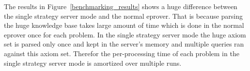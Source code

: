 The results in Figure~\ref{benchmarking_results} shows a huge difference between the single strategy server mode and the normal eprover. That is because parsing the huge knowledge base takes large amount of time which is done in the normal eprover once for each problem. In the single strategy server mode the huge axiom set is parsed only once and kept in the server's memory and multiple queries ran against this axiom set. Therefor the per-processing time of each problem in the single strategy server mode is amortized over multiple runs.
